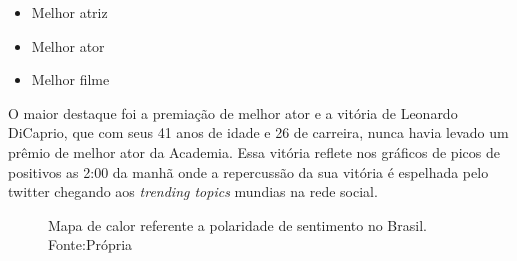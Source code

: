  \begin{itemize}
 	\item Melhor atriz
 	\item Melhor ator
 	\item Melhor filme
 \end{itemize}

O maior destaque foi a premiação de melhor ator e a vitória de Leonardo DiCaprio, que com seus 41 anos de idade e 26 de carreira, nunca havia levado um prêmio de melhor ator da Academia. Essa vitória reflete nos gráficos de picos de positivos as 2:00 da manhã onde a repercussão da sua vitória é espelhada pelo twitter chegando aos \textit{trending topics} mundias na rede social.


\begin{figure}[!h]
	\centering{}
	\caption{Mapa de calor referente a polaridade de sentimento no Brasil. Fonte:Própria}
	\label{mapa}
\end{figure}